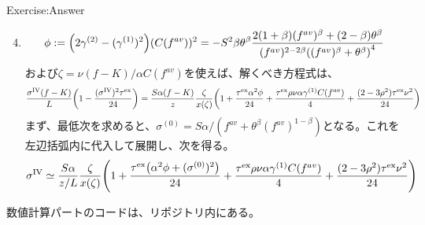 \documentclass[dvipdfmx,9pt]{beamer}
\begin{document}
\begin{frame}{Exercise:Answer}
  \begin{enumerate}\setcounter{enumi}{3}
    \item
          \begin{equation}
            \phi := \pqty{2\gamma^{(2)} - (\gamma^{(1)})^{2}}(C(f^{av}))^{2}
            = -S^{2}\beta \theta^{\beta}\frac{2(1+\beta)(f^{av})^{\beta} + (2-\beta)\theta^{\beta}}{(f^{av})^{2-2\beta}\pqty{(f^{av})^{\beta} + \theta^{\beta}}^{4}}
          \end{equation}
          および$\zeta = \nu (f-K) / \alpha C(f^{av})$を使えば、解くべき方程式は、
          {\tiny
          \begin{equation}
            \frac{\sigma^{\mathrm{IV}}(f-K)}{L} \pqty{1 - \frac{(\sigma^{\mathrm{IV}})^{2}\tau^{\mathrm{ex}}}{24}} = \frac{S \alpha (f-K)}{z}\frac{\zeta}{x(\zeta)} \pqty{ 1 + \frac{\tau^{\mathrm{ex}}\alpha^{2}\phi}{24} + \frac{\tau^{\mathrm{ex}}\rho\nu\alpha\gamma^{(1)}C(f^{av})}{4} + \frac{(2-3\rho^{2})\tau^{\mathrm{ex}}\nu^{2}}{24}}
          \end{equation}
          }
          まず、最低次を求めると、$\sigma^{(0)} = S\alpha /(f^{av} + \theta^{\beta}(f^{av})^{1-\beta})$となる。これを左辺括弧内に代入して展開し、次を得る。
          \begin{equation}
            \sigma^{\mathrm{IV}} \simeq \frac{S\alpha}{z/L} \frac{\zeta}{x(\zeta)}\pqty{ 1 + \frac{\tau^{\mathrm{ex}}\pqty{\alpha^{2}\phi + (\sigma^{(0)})^{2}}}{24} + \frac{\tau^{\mathrm{ex}}\rho\nu\alpha\gamma^{(1)}C(f^{av})}{4} + \frac{(2-3\rho^{2})\tau^{\mathrm{ex}}\nu^{2}}{24}}
          \end{equation}
  \end{enumerate}
  数値計算パートのコードは、リポジトリ内にある。
\end{frame}
\end{document}
